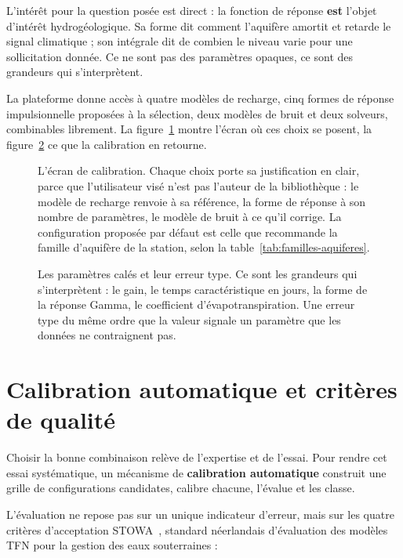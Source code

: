 L'intérêt pour la question posée est direct : la fonction de réponse \textbf{est} l'objet
d'intérêt hydrogéologique. Sa forme dit comment l'aquifère amortit et retarde le signal
climatique ; son intégrale dit de combien le niveau varie pour une sollicitation donnée. Ce ne
sont pas des paramètres opaques, ce sont des grandeurs qui s'interprètent.

La plateforme donne accès à quatre modèles de recharge, cinq formes de réponse impulsionnelle proposées à la sélection,
deux modèles de bruit et deux solveurs, combinables librement. La figure~\ref{fig:pastas-config}
montre l'écran où ces choix se posent, la figure~\ref{fig:pastas-parametres} ce que la
calibration en retourne.

\begin{figure}[htbp]
\centering
{}
\caption{L'écran de calibration. Chaque choix porte sa justification en clair, parce que
l'utilisateur visé n'est pas l'auteur de la bibliothèque : le modèle de recharge renvoie à sa
référence, la forme de réponse à son nombre de paramètres, le modèle de bruit à ce qu'il corrige.
La configuration proposée par défaut est celle que recommande la famille d'aquifère de la station,
selon la table~\ref{tab:familles-aquiferes}.}
\label{fig:pastas-config}
\end{figure}

\begin{figure}[htbp]
\centering
{}
\caption{Les paramètres calés et leur erreur type. Ce sont les grandeurs qui s'interprètent :
le gain, le temps caractéristique en jours, la forme de la réponse Gamma, le coefficient
d'évapotranspiration. Une erreur type du même ordre que la valeur signale un paramètre que les
données ne contraignent pas. \lecas}
\label{fig:pastas-parametres}
\end{figure}

\section{Calibration automatique et critères de qualité}

Choisir la bonne combinaison relève de l'expertise et de l'essai. Pour rendre cet essai
systématique, un mécanisme de \textbf{calibration automatique} construit une grille de
configurations candidates, calibre chacune, l'évalue et les classe.

L'évaluation ne repose pas sur un unique indicateur d'erreur, mais sur les quatre critères
d'acceptation STOWA~\cite{stowa2021}, standard néerlandais d'évaluation des modèles TFN pour la
gestion des eaux souterraines :

